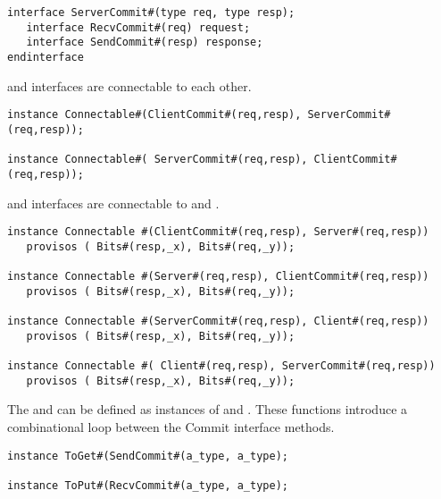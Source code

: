 \begin{verbatim}
interface ServerCommit#(type req, type resp);
   interface RecvCommit#(req) request;
   interface SendCommit#(resp) response;
endinterface
\end{verbatim}


 and  interfaces are connectable to
each other.

\begin{verbatim}
instance Connectable#(ClientCommit#(req,resp), ServerCommit#(req,resp));

instance Connectable#( ServerCommit#(req,resp), ClientCommit#(req,resp));
\end{verbatim}

 and  interfaces are connectable to
    and .


\begin{verbatim}
instance Connectable #(ClientCommit#(req,resp), Server#(req,resp))
   provisos ( Bits#(resp,_x), Bits#(req,_y));

instance Connectable #(Server#(req,resp), ClientCommit#(req,resp))
   provisos ( Bits#(resp,_x), Bits#(req,_y));

instance Connectable #(ServerCommit#(req,resp), Client#(req,resp))
   provisos ( Bits#(resp,_x), Bits#(req,_y));

instance Connectable #( Client#(req,resp), ServerCommit#(req,resp))
   provisos ( Bits#(resp,_x), Bits#(req,_y));
\end{verbatim}


The  and  can be defined as instances of
 and .  These functions introduce a combinational
loop between the Commit interface methods.

\begin{verbatim}
instance ToGet#(SendCommit#(a_type, a_type);

instance ToPut#(RecvCommit#(a_type, a_type);
\end{verbatim}


